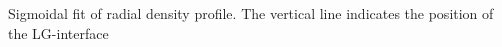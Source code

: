 \label{fig:sigmoid}Sigmoidal fit of radial density profile. The
vertical line indicates the position of the LG-interface 